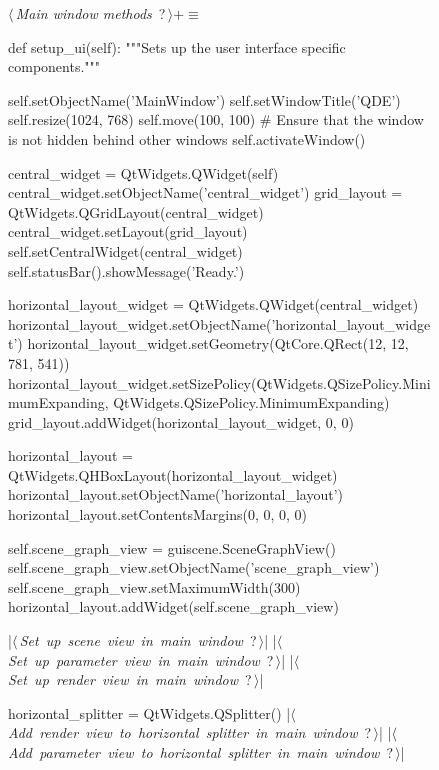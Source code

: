 \documentclass[%
    a4paper,    %
    justified,  %
    nobib,      %
    openany     %
]{tufte-book}
\begin{document}
\begin{figure}
\begin{flushleft} \small
\begin{minipage}{\linewidth}\label{scrap20}\raggedright\small
{} $\langle\,${\itshape Main window methods}\nobreak\ {\footnotesize {?}}$\,\rangle+\equiv$
\vspace{-1ex}
\begin{pythoncode}
def setup_ui(self):
    """Sets up the user interface specific components."""

    self.setObjectName('MainWindow')
    self.setWindowTitle('QDE')
    self.resize(1024, 768)
    self.move(100, 100)
    # Ensure that the window is not hidden behind other windows
    self.activateWindow()

    central_widget = QtWidgets.QWidget(self)
    central_widget.setObjectName('central_widget')
    grid_layout = QtWidgets.QGridLayout(central_widget)
    central_widget.setLayout(grid_layout)
    self.setCentralWidget(central_widget)
    self.statusBar().showMessage('Ready.')

    horizontal_layout_widget = QtWidgets.QWidget(central_widget)
    horizontal_layout_widget.setObjectName('horizontal_layout_widget')
    horizontal_layout_widget.setGeometry(QtCore.QRect(12, 12, 781, 541))
    horizontal_layout_widget.setSizePolicy(QtWidgets.QSizePolicy.MinimumExpanding,
    QtWidgets.QSizePolicy.MinimumExpanding)
    grid_layout.addWidget(horizontal_layout_widget, 0, 0)

    horizontal_layout = QtWidgets.QHBoxLayout(horizontal_layout_widget)
    horizontal_layout.setObjectName('horizontal_layout')
    horizontal_layout.setContentsMargins(0, 0, 0, 0)

    self.scene_graph_view = guiscene.SceneGraphView()
    self.scene_graph_view.setObjectName('scene_graph_view')
    self.scene_graph_view.setMaximumWidth(300)
    horizontal_layout.addWidget(self.scene_graph_view)

    |\hbox{$\langle\,${\itshape Set up scene view in main window}\nobreak\ {\footnotesize ?}$\,\rangle$}|
    |\hbox{$\langle\,${\itshape Set up parameter view in main window}\nobreak\ {\footnotesize ?}$\,\rangle$}|
    |\hbox{$\langle\,${\itshape Set up render view in main window}\nobreak\ {\footnotesize ?}$\,\rangle$}|

    horizontal_splitter = QtWidgets.QSplitter()
    |\hbox{$\langle\,${\itshape Add render view to horizontal splitter in main window}\nobreak\ {\footnotesize ?}$\,\rangle$}|
    |\hbox{$\langle\,${\itshape Add parameter view to horizontal splitter in main window}\nobreak\ {\footnotesize ?}$\,\rangle$}|


\end{pythoncode}
\end{minipage}
\end{flushleft}
\end{figure}
\end{document}
